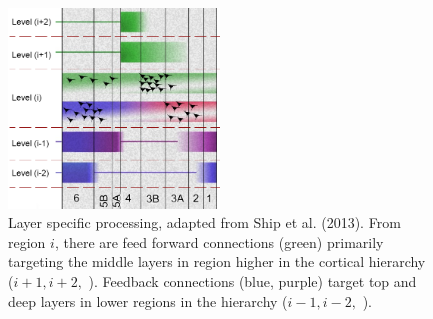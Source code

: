 \begin{figure}[!ht]
	\centering
	\includegraphics[width=0.5\textwidth, clip=true]{./Chapters/01_Introduction/Images/LaminarProcessing}
	\caption{Layer specific processing, adapted from Ship et al. (2013)\cite{Shipp2013}. From region $i$, there are feed forward connections (green) primarily targeting the middle layers in region higher in the cortical hierarchy ($i+1, i+2, $ \textellipsis). Feedback connections (blue, purple) target top and deep layers in lower regions in the hierarchy ($i-1, i-2,$ \textellipsis).}
	\label{fig:layerprocessing}
\end{figure}